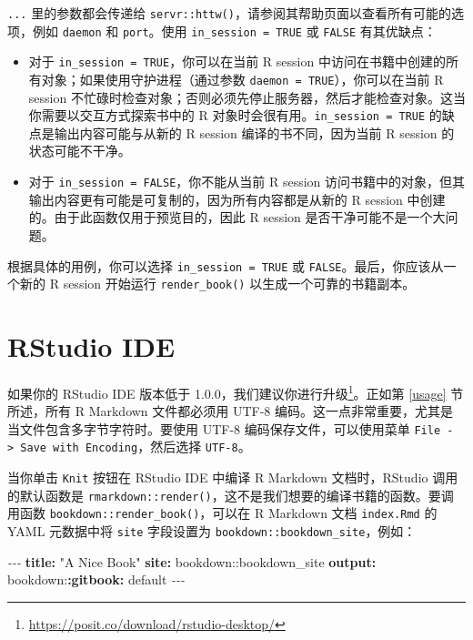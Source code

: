 \documentclass[
  12pt,
]{krantz}
\newenvironment{Shaded}{\begin{snugshade}}{\end{snugshade}}
\newcommand{\AttributeTok}[1]{\textcolor[rgb]{0.13,0.29,0.53}{#1}}
\newcommand{\FunctionTok}[1]{\textcolor[rgb]{0.13,0.29,0.53}{\textbf{#1}}}
\newcommand{\KeywordTok}[1]{\textcolor[rgb]{0.13,0.29,0.53}{\textbf{#1}}}
\newcommand{\PreprocessorTok}[1]{\textcolor[rgb]{0.56,0.35,0.01}{\textit{#1}}}
\newcommand{\StringTok}[1]{\textcolor[rgb]{0.31,0.60,0.02}{#1}}
\providecommand{\tightlist}{%
  \setlength{\itemsep}{0pt}\setlength{\parskip}{0pt}}
\renewcommand{\href}[2]{#2\footnote{\url{#1}}}
\theoremstyle{definition}
\theoremstyle{definition}
\theoremstyle{definition}
\theoremstyle{definition}
\theoremstyle{remark}
\begin{document}
\texttt{...} 里的参数都会传递给 \texttt{servr::httw()}，请参阅其帮助页面以查看所有可能的选项，例如 \texttt{daemon} 和 \texttt{port}。使用 \texttt{in\_session\ =\ TRUE} 或 \texttt{FALSE} 有其优缺点：

\begin{itemize}
\tightlist
\item
  对于 \texttt{in\_session\ =\ TRUE}，你可以在当前 R session 中访问在书籍中创建的所有对象；如果使用守护进程（通过参数 \texttt{daemon\ =\ TRUE}），你可以在当前 R session 不忙碌时检查对象；否则必须先停止服务器，然后才能检查对象。这当你需要以交互方式探索书中的 R 对象时会很有用。\texttt{in\_session\ =\ TRUE} 的缺点是输出内容可能与从新的 R session 编译的书不同，因为当前 R session 的状态可能不干净。
\item
  对于 \texttt{in\_session\ =\ FALSE}，你不能从当前 R session 访问书籍中的对象，但其输出内容更有可能是可复制的，因为所有内容都是从新的 R session 中创建的。由于此函数仅用于预览目的，因此 R session 是否干净可能不是一个大问题。
\end{itemize}

根据具体的用例，你可以选择 \texttt{in\_session\ =\ TRUE} 或 \texttt{FALSE}。最后，你应该从一个新的 R session 开始运行 \texttt{render\_book()} 以生成一个可靠的书籍副本。

\section{RStudio IDE}\label{rstudio-ide}

如果你的 RStudio IDE 版本低于 1.0.0，我们建议你进行\href{https://posit.co/download/rstudio-desktop/}{升级}。正如第 \ref{usage} 节所述，所有 R Markdown 文件都必须用 UTF-8 编码。这一点非常重要，尤其是当文件包含多字节字符时。要使用 UTF-8 编码保存文件，可以使用菜单 \texttt{File\ -\textgreater{}\ Save\ with\ Encoding}，然后选择 \texttt{UTF-8}。

当你单击 \texttt{Knit} 按钮在 RStudio IDE 中编译 R Markdown 文档时，RStudio 调用的默认函数是 \texttt{rmarkdown::render()}，这不是我们想要的编译书籍的函数。要调用函数 \texttt{bookdown::render\_book()}，可以在 R Markdown 文档 \texttt{index.Rmd} 的 YAML 元数据中将 \texttt{site} 字段设置为 \texttt{bookdown::bookdown\_site}，例如：

\begin{Shaded}
\begin{Highlighting}[]
\PreprocessorTok{{-}{-}{-}}
\FunctionTok{title}\KeywordTok{:}\AttributeTok{ }\StringTok{"A Nice Book"}
\FunctionTok{site}\KeywordTok{:}\AttributeTok{ bookdown::bookdown\_site}
\FunctionTok{output}\KeywordTok{:}
\AttributeTok{  bookdown:}\FunctionTok{:gitbook}\KeywordTok{:}\AttributeTok{ default}
\PreprocessorTok{{-}{-}{-}}
\end{Highlighting}
\end{Shaded}
\end{document}
